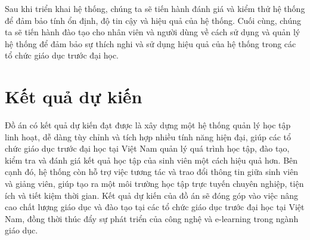 \documentclass[../Thesis.tex]{subfiles}
\begin{document}
Sau khi triển khai hệ thống, chúng ta sẽ tiến hành đánh giá và kiểm thử hệ thống để đảm bảo tính ổn định, độ tin cậy và hiệu quả của hệ thống. Cuối cùng, chúng ta sẽ tiến hành đào tạo cho nhân viên và người dùng về cách sử dụng và quản lý hệ thống để đảm bảo sự thích nghi và sử dụng hiệu quả của hệ thống trong các tổ chức giáo dục trước đại học.

\section{Kết quả dự kiến}

Đồ án có kết quả dự kiến đạt được là xây dựng một hệ thống quản lý học tập linh hoạt, dễ dàng tùy chỉnh và tích hợp nhiều tính năng hiện đại, giúp các tổ chức giáo dục trước đại học tại Việt Nam quản lý quá trình học tập, đào tạo, kiểm tra và đánh giá kết quả học tập của sinh viên một cách hiệu quả hơn. Bên cạnh đó, hệ thống còn hỗ trợ việc tương tác và trao đổi thông tin giữa sinh viên và giảng viên, giúp tạo ra một môi trường học tập trực tuyến chuyên nghiệp, tiện ích và tiết kiệm thời gian. Kết quả dự kiến của đồ án sẽ đóng góp vào việc nâng cao chất lượng giáo dục và đào tạo tại các tổ chức giáo dục trước đại học tại Việt Nam, đồng thời thúc đẩy sự phát triển của công nghệ và e-learning trong ngành giáo dục.
\end{document}
